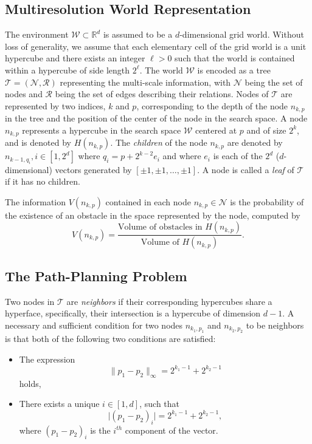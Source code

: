 \documentclass[letterpaper, 10 pt, conference]{ieeeconf}
\theoremstyle{definition}
\begin{document}
\subsection{Multiresolution World Representation}

The environment $\mathcal{W} \subset \mathbb{R}^d$ is assumed to be a $d$-dimensional grid world.
Without loss of generality, we assume that each elementary cell of the grid world is a unit hypercube and there exists an integer $\ell>0$ such that the world is contained within a hypercube of side length $2^{\ell}$.
The world $\mathcal{W}$ is encoded  as a tree $\mathcal{T}=(\mathcal{N},\mathcal{R})$ representing the multi-scale information, with $\mathcal{N}$ being the set of nodes and $\mathcal{R}$ being the set of edges describing their relations.
Nodes of $\mathcal{T}$ are represented by two indices, $k$ and $p$, corresponding to the depth of the node $n_{k,p}$ in the tree and the position of the center of the node in the search space.
A node $n_{k,p}$ represents a hypercube in the search space $\mathcal{W}$ centered at $p$ and of size $2^{k}$, and is denoted by $H(n_{k,p})$.
The \textit{children} of the node $n_{k,p}$ are denoted by $n_{k-1,q_i}, i\in[1,2^d]$ where $q_i=p+2^{k- 2}e_i$ and where $e_i$ is each of the $2^d$ ($d$-dimensional) vectors generated by $[\pm 1,\pm 1, \dots, \pm 1]$.
A node is called a \textit{leaf} of $\mathcal{T}$ if it has no children.

The information $V(n_{k,p})$ contained in each node $n_{k,p}\in \mathcal{N}$ is the probability of the existence of an obstacle in the space represented by the node, computed by
\begin{equation}
V(n_{k,p})=\frac{\text{Volume of obstacles in $H(n_{k,p})$}}{\text{Volume of $H(n_{k,p})$}}.
\end{equation}

\subsection{The Path-Planning Problem}

Two nodes in $\mathcal{T}$ are \textit{neighbors}  if their corresponding hypercubes share a hyperface, specifically, their
intersection is a hypercube of dimension $d-1$. A necessary and sufficient condition for two  nodes $n_{k_1,p_1}$ and $n_{k_2,p_2}$ to be neighbors is that both of the following two conditions are satisfied:

\begin{itemize}
\item The expression
\begin{equation}
\label{nc1}
\|p_1-p_2\|_\infty = 2^{k_1-1}+2^{k_2-1}
\end{equation}
holds,
\item
There exists a unique $i\in[1,d]$, such that
\begin{equation}
\label{nc2}
\vert(p_1-p_2)_i\vert=2^{k_1-1}+2^{k_2-1},
\end{equation}
where $(p_1-p_2)_i$ is the $i^{th}$ component of the vector.
\end{itemize}
\end{document}

